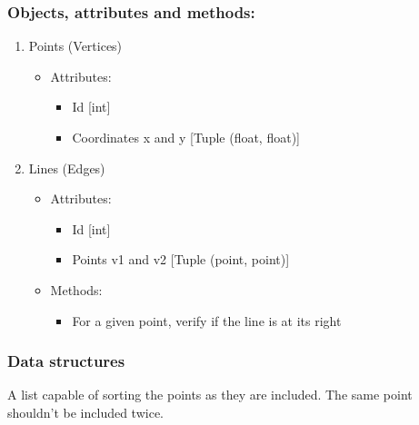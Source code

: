 \documentclass[12pt, a4paper]{article}
\begin{document}
\subsubsection{Objects, attributes and methods:}
\begin{enumerate}
  \item Points (Vertices)
        \begin{itemize}
          \item Attributes:
                \begin{itemize}
                  \item Id [int]
                  \item Coordinates x and y [Tuple (float, float)]
                \end{itemize}
        \end{itemize}
  \item Lines (Edges)
        \begin{itemize}
          \item Attributes:
                \begin{itemize}
                  \item Id [int]
                  \item Points v1 and v2 [Tuple (point, point)]
                \end{itemize}
          \item Methods:
               \begin{itemize}
                  \item For a given point, verify if the line is at its right
               \end{itemize}
        \end{itemize}
\end{enumerate}

\subsubsection{Data structures}
A list capable of sorting the points as they are included. The same point shouldn't be included twice.


\end{document}
